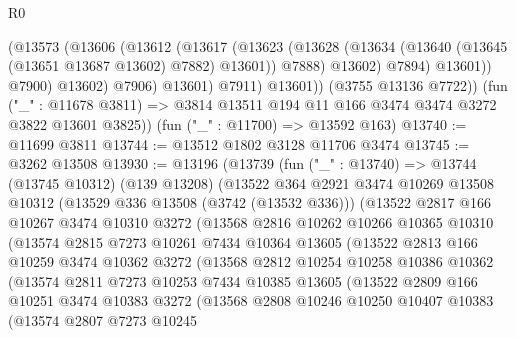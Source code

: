 \begin{lexlean}{R0}
\begin{coremodule}
                    (@13573
                      (@13606
                        (@13612
                          (@13617
                            (@13623
                              (@13628
                                (@13634 (@13640 (@13645 (@13651 @13687 @13602) @7882) @13601))
                                @7888)
                              @13602)
                            @7894)
                          @13601))
                      @7900)
                    @13602)
                  @7906)
                @13601)
              @7911)
            @13601))
        (@3755 @13136 @7722))
      (fun ("_" : @11678 @3811) => @3814 @13511 @194 @11 @166 @3474 @3474 @3272 @3822 @13601 @3825))
    (fun ("_" : @11700) => @13592 @163)
@13740 := @11699 @3811
@13744 := @13512 @1802 @3128 @11706 @3474
@13745 := @3262 @13508
@13930 := @13196
    (@13739
      (fun ("_" : @13740) =>
      @13744
        (@13745 @10312)
        (@139 @13208)
        (@13522
          @364
          @2921
          @3474
          @10269
          @13508
          @10312
          (@13529 @336 @13508 (@3742 (@13532 @336)))
          (@13522
            @2817
            @166
            @10267
            @3474
            @10310
            @3272
            (@13568
              @2816
              @10262
              @10266
              @10365
              @10310
              (@13574
                @2815
                @7273
                @10261
                @7434
                @10364
                @13605
                (@13522
                  @2813
                  @166
                  @10259
                  @3474
                  @10362
                  @3272
                  (@13568
                    @2812
                    @10254
                    @10258
                    @10386
                    @10362
                    (@13574
                      @2811
                      @7273
                      @10253
                      @7434
                      @10385
                      @13605
                      (@13522
                        @2809
                        @166
                        @10251
                        @3474
                        @10383
                        @3272
                        (@13568
                          @2808
                          @10246
                          @10250
                          @10407
                          @10383
                          (@13574
                            @2807
                            @7273
                            @10245

\end{coremodule}
\end{lexlean}
